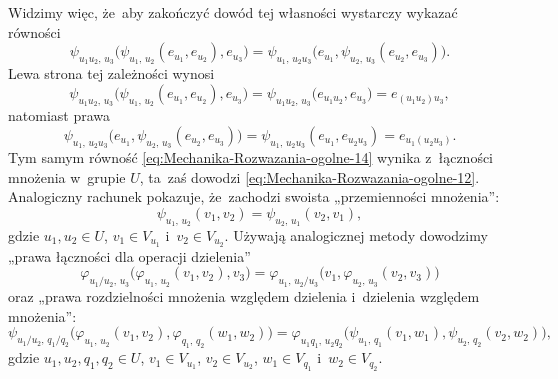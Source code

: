 \documentclass[a4paper,11pt]{article}
\begin{document}
Widzimy więc, że~aby zakończyć dowód tej własności wystarczy wykazać
równości
\begin{equation}
  \label{eq:Mechanika-Rozwazania-ogolne-14}
  \psi_{ u_{ 1 } u_{ 2 }, \, u_{ 3 } }\big(
  \psi_{ u_{ 1 }, \, u_{ 2 } }( e_{ u_{ 1 } }, e_{ u_{ 2 } } ), e_{ u_{ 3 } }
  \big)
  =
  \psi_{ u_{ 1 }, \, u_{ 2 } u_{ 3 } }\big(
  e_{ u_{ 1 } }, \psi_{ u_{ 2 }, \, u_{ 3 } }( e_{ u_{ 2 } }, e_{ u_{ 3 } } )
  \big).
\end{equation}
Lewa strona tej zależności wynosi
\begin{equation}
  \label{eq:Mechanika-Rozwazania-ogolne-15}
  \psi_{ u_{ 1 } u_{ 2 }, \, u_{ 3 } }\big(
  \psi_{ u_{ 1 }, \, u_{ 2 } }( e_{ u_{ 1 } }, e_{ u_{ 2 } } ), e_{ u_{ 3 } }
  \big) =
  \psi_{ u_{ 1 } u_{ 2 }, \, u_{ 3 } }\big( e_{ u_{ 1 } u_{ 2 } }, e_{ u_{ 3 } }
  \big) =
  e_{ ( u_{ 1 } u_{ 2 } ) u_{ 3 } },
\end{equation}
natomiast prawa
\begin{equation}
  \label{eq:Mechanika-Rozwazania-ogolne-16}
  \psi_{ u_{ 1 }, \, u_{ 2 } u_{ 3 } }\big(
  e_{ u_{ 1 } }, \psi_{ u_{ 2 }, \, u_{ 3 } }( e_{ u_{ 2 } }, e_{ u_{ 3 } } )
  \big) =
  \psi_{ u_{ 1 }, \, u_{ 2 } u_{ 3 } }( e_{ u_{ 1 } }, e_{ u_{ 2 } u_{ 3 } } ) =
  e_{ u_{ 1 } ( u_{ 2 } u_{ 3 } ) }.
\end{equation}
Tym samym równość \eqref{eq:Mechanika-Rozwazania-ogolne-14} wynika
z~łączności mnożenia w~grupie $U$, ta~zaś dowodzi
\eqref{eq:Mechanika-Rozwazania-ogolne-12}. Analogiczny rachunek pokazuje,
że~zachodzi swoista „przemienności mnożenia”:
\begin{equation}
  \label{eq:Mechanika-Rozwazania-ogolne-17}
  \psi_{ u_{ 1 }, \, u_{ 2 } }( v_{ 1 }, v_{ 2 } ) =
  \psi_{ u_{ 2 }, \, u_{ 1 } }( v_{ 2 }, v_{ 1 } ),
\end{equation}
gdzie $u_{ 1 }, u_{ 2 } \in U$, $v_{ 1 } \in V_{ u_{ 1 } }$
i~$v_{ 2 } \in V_{ u_{ 2 } }$. Używają analogicznej metody dowodzimy
„prawa łączności dla operacji dzielenia”
\begin{equation}
  \label{eq:Mechanika-Rozwazania-ogolne-18}
  \varphi_{ u_{ 1 } / u_{ 2 }, \, u_{ 3 } }\big(
  \varphi_{ u_{ 1 }, \, u_{ 2 } }( v_{ 1 }, v_{ 2 } ), v_{ 3 } \big) =
  \varphi_{ u_{ 1 }, \, u_{ 2 } / u_{ 3 } }\big(
  v_{ 1 }, \varphi_{ u_{ 2 }, \, u_{ 3 } }( v_{ 2 }, v_{ 3 } ) \big)
\end{equation}
oraz „prawa rozdzielności mnożenia względem dzielenia i~dzielenia
względem mnożenia”:
\begin{equation}
  \label{eq:Mechanika-Rozwazania-ogolne-19}
  \psi_{ u_{ 1 } / u_{ 2 }, \, q_{ 1 } / q_{ 2 } }\big(
  \varphi_{ u_{ 1 }, \, u_{ 2 } }( v_{ 1 }, v_{ 2 } ),
  \varphi_{ q_{ 1 }, \, q_{ 2 } }( w_{ 1 }, w_{ 2 } ) \big) =
  \varphi_{ u_{ 1 } q_{ 1 }, \, u_{ 2 } q_{ 2 } }\big(
  \psi_{ u_{ 1 }, \, q_{ 1 } }( v_{ 1 }, w_{ 1 } ),
  \psi_{ u_{ 2 }, \, q_{ 2 } }( v_{ 2 }, w_{ 2 } ) \big),
\end{equation}
gdzie $u_{ 1 }, u_{ 2 }, q_{ 1 }, q_{ 2 } \in U$, $v_{ 1 } \in V_{ u_{ 1 } }$,
$v_{ 2 } \in V_{ u_{ 2 } }$, $w_{ 1 } \in V_{ q_{ 1 } }$ i~$w_{ 2 } \in V_{ q_{ 2 } }$.
\end{document}
